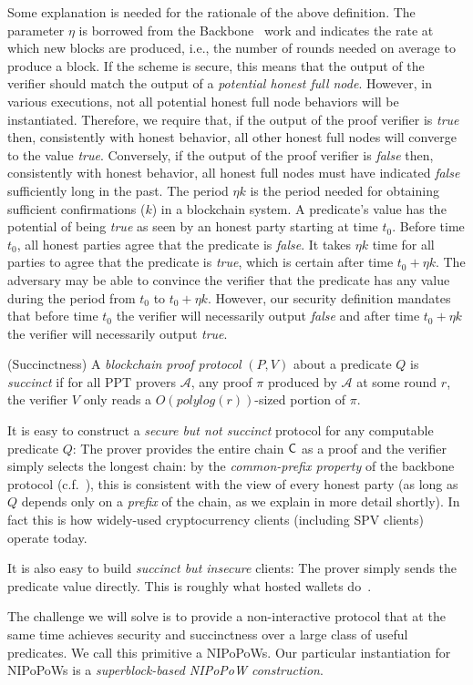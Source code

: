 Some explanation is needed for the rationale of the above definition. The
parameter $\eta$ is borrowed from the Backbone~\cite{backbone} work and
indicates the rate at which new blocks are produced, i.e., the number of rounds
needed on average to produce a block. If the scheme is secure, this means that
the output of the verifier should match the output of a \emph{potential honest
full node}. However, in various executions, not all potential honest full node
behaviors will be instantiated. Therefore, we require that, if the output of the
proof verifier is \emph{true} then, consistently with honest behavior, all other
honest full nodes will converge to the value \emph{true}. Conversely, if the
output of the proof verifier is \emph{false} then, consistently with honest
behavior, all honest full nodes must have indicated \emph{false} sufficiently
long in the past. The period $\eta k$ is the period needed for obtaining
sufficient confirmations ($k$) in a blockchain system. A predicate's value has
the potential of being \emph{true} as seen by an honest party starting at time
$t_0$. Before time $t_0$, all honest parties agree that the predicate is
\emph{false}. It takes $\eta k$ time for all parties to agree that the predicate
is \emph{true}, which is certain after time $t_0 + \eta k$. The adversary may be
able to convince the verifier that the predicate has any value during the period
from $t_0$ to $t_0 + \eta k$. However, our security definition mandates that
before time $t_0$ the verifier will necessarily output \emph{false} and after
time $t_0 + \eta k$ the verifier will necessarily output \emph{true}.

\begin{definition}{(Succinctness)}
A \emph{blockchain proof protocol} $(P, V)$ about a predicate $Q$ is
\emph{succinct} if for all PPT provers $\mathcal{A}$, any proof $\pi$ produced
by $\mathcal{A}$ at some round $r$, the verifier $V$ only reads a
$O(polylog(r))$-sized portion of $\pi$.
\end{definition}

It is easy to construct a \emph{secure but not succinct} protocol for any
computable predicate $Q$: The prover provides the entire chain $\mathsf{C}$ as a
proof and the verifier simply selects the longest chain: by the
\emph{common-prefix property} of the backbone protocol (c.f.~\cite{backbone}),
this is consistent with the view of every honest party (as long as $Q$ depends
only on a \emph{prefix} of the chain, as we explain in more detail shortly). In
fact this is how widely-used cryptocurrency clients (including SPV clients)
operate today.

It is also easy to build \emph{succinct but insecure} clients: The prover simply
sends the predicate value directly. This is roughly what hosted wallets
do~\cite{sok}.

The challenge we will solve is to provide a non-interactive protocol that at the
same time achieves security and succinctness over a large class of useful
predicates. We call this primitive a NIPoPoWs. Our particular instantiation for
NIPoPoWs is a \emph{superblock-based NIPoPoW construction}.
